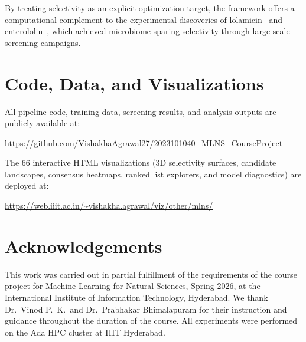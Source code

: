 \documentclass{article}
\begin{document}
By treating selectivity as an explicit optimization target, the framework offers a computational complement to the experimental discoveries of lolamicin~\citep{munoz2024} and enterololin~\citep{catacutan2025}, which achieved microbiome-sparing selectivity through large-scale screening campaigns.


\section{Code, Data, and Visualizations}
\label{sec:resources}

All pipeline code, training data, screening results, and analysis outputs are publicly available at:

\begin{center}
\small
\url{https://github.com/VishakhaAgrawal27/2023101040_MLNS_CourseProject}
\end{center}

\noindent The 66 interactive HTML visualizations (3D selectivity surfaces, candidate landscapes, consensus heatmaps, ranked list explorers, and model diagnostics) are deployed at:

\begin{center}
\small
\url{https://web.iiit.ac.in/~vishakha.agrawal/viz/other/mlns/}
\end{center}


\section*{Acknowledgements}

This work was carried out in partial fulfillment of the requirements of the course project for Machine Learning for Natural Sciences, Spring 2026, at the International Institute of Information Technology, Hyderabad.
We thank Dr.\ Vinod P.\ K.\ and Dr.\ Prabhakar Bhimalapuram for their instruction and guidance throughout the duration of the course.
All experiments were performed on the Ada HPC cluster at IIIT Hyderabad.



\end{document}
